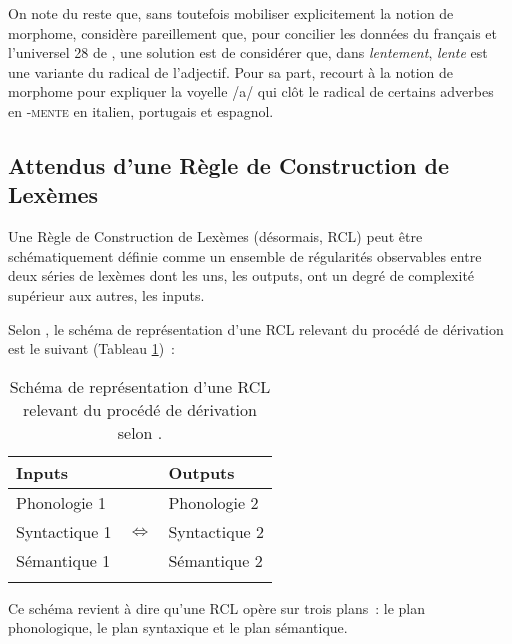 \documentclass[output=paper]{langsci/langscibook}
\begin{document}
On note du reste que, sans toutefois mobiliser explicitement la notion de morphome,  %
\citet[19]{Hacken14} %
%
considère pareillement que, pour concilier les données du français et l'universel 28 de \citeauthor{Greenberg1963}, une solution est de considérer que, dans \emph{lentement}, \emph{lente} est une variante du radical de l'adjectif. Pour sa part, %
\citet[1392]{Ricca15} %
%
recourt à la notion de morphome pour expliquer la voyelle /a/ qui clôt le radical de certains adverbes en -\textsc{mente} en italien, portugais et espagnol.

\subsection{Attendus d'une Règle de Construction de Lexèmes}\label{section:dal:3.2}

Une Règle de Construction de Lexèmes (désormais, RCL) peut être schématiquement définie comme un ensemble de régularités observables entre deux séries de lexèmes dont les uns, les outputs, ont un degré de complexité supérieur aux autres, les inputs.

Selon %
\citet{Fradin03}%
%
, le schéma de représentation d'une RCL relevant du procédé de dérivation est le suivant (Tableau \ref{tab:Dal:3})~:

\begin{table}
\begin{tabular}{lcl}
\lsptoprule
Inputs & \hspace*{3cm} & Outputs \\
\midrule 
Phonologie 1 & & Phonologie 2 \\
Syntactique 1 & $\Leftrightarrow$ & Syntactique 2 \\
Sémantique 1 & & Sémantique 2 \\

\lspbottomrule
\end{tabular}
\caption{Schéma de représentation d'une RCL relevant du procédé de dérivation selon %
\citet{Fradin03}%
%
.}
\label{tab:Dal:3}
\end{table}

Ce schéma revient à dire qu'une RCL opère sur trois plans~: le plan phonologique, le plan syntaxique et le plan sémantique.
\end{document}
